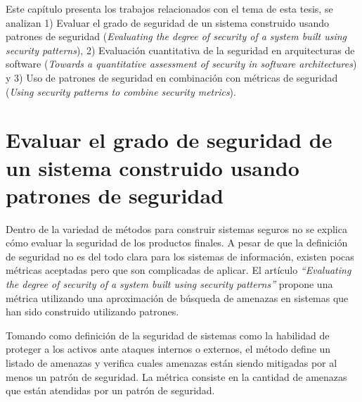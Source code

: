 %
Este capítulo presenta los trabajos relacionados con el tema de esta tesis, se analizan 1) Evaluar el grado de seguridad de un sistema construido usando patrones de seguridad (\textit{Evaluating the degree of security of a system built using security patterns}), 2) Evaluación cuantitativa de la seguridad en arquitecturas de software (\textit{Towards a quantitative assessment of security in software architectures}) y 3) Uso de patrones de seguridad en combinación con métricas de seguridad (\textit{Using security patterns to combine security metrics}).
%
%

\section{Evaluar el grado de seguridad de un sistema construido usando patrones de seguridad}

Dentro de la variedad de métodos para construir sistemas seguros no se explica cómo evaluar la seguridad de los productos finales. A pesar de que la definición de seguridad no es del todo clara para los sistemas de información, existen pocas métricas aceptadas pero que son complicadas de aplicar. El artículo \textit{``Evaluating the degree of security of a system built using security patterns''} \cite{FerYosWas18} propone una métrica utilizando una aproximación  de búsqueda de amenazas en sistemas que han sido construido utilizando patrones. 

\vspace{0.3 cm}

Tomando como definición de la seguridad de sistemas como la habilidad de proteger a los activos ante ataques internos o externos, el método define un listado de amenazas y verifica cuales amenazas están siendo mitigadas por al menos un patrón de seguridad. La métrica consiste en la cantidad de amenazas que están atendidas por un patrón de seguridad. 

\vspace{0.3 cm}


